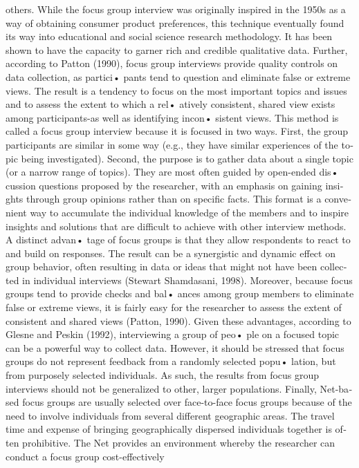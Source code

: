 \documentclass[a4 paper,12pt]{article}\usepackage{xepersian}
\begin{document}
\begin{latin}
  \vspace{0.1cm}

\vspace{0.1cm}     
\noindent
others. While  the focus group interview was originally inspired in the  1950s as a way of obtaining consumer  product  preferences, this technique  eventually  found  its way into educational  and social science research  methodology.  It has been shown to have the capacity to garner rich and credible qualitative data. Further, according to Patton (1990), focus group  interviews provide quality controls on data collection, as partici• pants  tend to question  and eliminate false or extreme views. The result is a tendency to focus on the most important topics and issues and to assess the extent to which a rel• atively consistent, shared view exists among participants-as well as identifying  incon• sistent views.
\vspace{0.1cm}
This method  is called a focus group interview because it is focused in two ways. First, the group participants  are similar in some way (e.g., they have similar experiences of the topic being investigated).  Second,  the purpose  is to gather data about a single topic  (or a narrow  range  of topics).  They  are most often guided  by open-ended dis• cussion questions  proposed by the researcher,  with an emphasis on gaining insights through group opinions rather  than on specific facts. This format is a convenient way to  accumulate the individual  knowledge  of the members and to inspire  insights and solutions  that are difficult to achieve with other interview methods. A distinct advan• tage of focus groups is that they allow respondents to react to and build on responses. The result can be a synergistic and dynamic effect on group behavior, often resulting in data or ideas that might not have been collected in individual interviews (Stewart  Shamdasani, 1998). Moreover, because focus groups tend to provide checks and bal• ances among group members to eliminate false or extreme views, it is fairly easy for the researcher to assess the  extent  of consistent and shared views (Patton,  1990). Given these advantages, according to Glesne and Peskin (1992), interviewing  a group of peo• ple on a focused topic  can be a powerful way to collect data. However, it should be stressed that focus groups do not represent feedback from a randomly  selected popu• lation, but from purposely  selected individuals. As such, the results from focus group interviews should not be generalized to other, larger populations.
\vspace{0.1cm}
Finally,  Net-based focus  groups  are usually  selected  over face-to-face  focus groups  because  of the need  to involve individuals  from several different geographic areas. The travel time  and expense of bringing  geographically dispersed individuals together  is  often   prohibitive.  The  Net  provides   an  environment  whereby  the researcher can conduct  a focus group cost-effectively


\end{latin}
\end{document}
